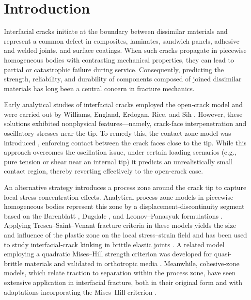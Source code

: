 \graphicspath{{06_Bogdanova/}}

\section{Introduction}
\label{BogdanovaSec1}

Interfacial cracks initiate at the boundary between dissimilar materials and represent a common defect in composites, laminates, sandwich panels, adhesive and welded joints, and surface coatings. When such cracks propagate in piecewise homogeneous bodies with contrasting mechanical properties, they can lead to partial or catastrophic failure during service. Consequently, predicting the strength, reliability, and durability of components composed of joined dissimilar materials has long been a central concern in fracture mechanics.

Early analytical studies of interfacial cracks employed the open‐crack model and were carried out by Williams, England, Erdogan, Rice, and Sih \cite{Bogdanova17,Bogdanova18,Bogdanova36,Bogdanova40}. However, these solutions exhibited nonphysical features—namely, crack‐face interpenetration and oscillatory stresses near the tip. To remedy this, the contact‐zone model was introduced \cite{Bogdanova1,Bogdanova10,Bogdanova11,Bogdanova19}, enforcing contact between the crack faces close to the tip. While this approach overcomes the oscillation issue, under certain loading scenarios (e.g., pure tension or shear near an internal tip) it predicts an unrealistically small contact region, thereby reverting effectively to the open‐crack case.

An alternative strategy introduces a process zone around the crack tip to capture local stress concentration effects. Analytical process‐zone models in piecewise homogeneous bodies represent this zone by a displacement‐discontinuity segment based on the Barenblatt \cite{Bogdanova2}, Dugdale \cite{Bogdanova16}, and Leonov–Panasyuk \cite{Bogdanova33} formulations \cite{Bogdanova24,Bogdanova25,Bogdanova29}. Applying Tresca–Saint–Venant fracture criteria in these models yields the size and influence of the plastic zone on the local stress–strain field \cite{Bogdanova24,Bogdanova29} and has been used to study interfacial‐crack kinking in brittle elastic joints \cite{Bogdanova25}. A related model employing a quadratic Mises–Hill strength criterion \cite{Bogdanova26} was developed for quasi-brittle materials and validated in orthotropic media \cite{Bogdanova27}. Meanwhile, cohesive-zone models, which relate traction to separation within the process zone, have seen extensive application in interfacial fracture, both in their original form \cite{Bogdanova21,Bogdanova31,Bogdanova37,Bogdanova38} and with adaptations incorporating the Mises–Hill criterion \cite{Bogdanova7,Bogdanova28}.


